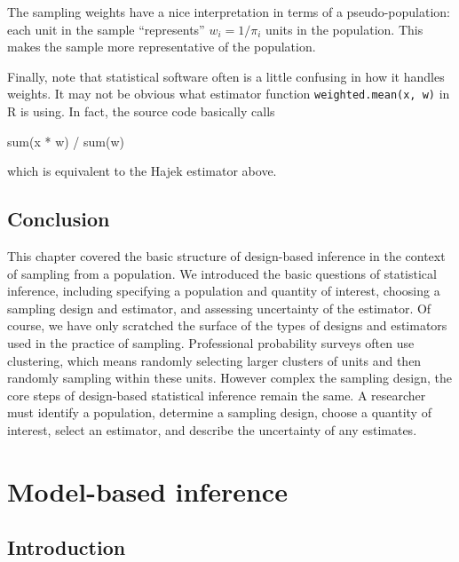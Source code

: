 \documentclass[
  letterpaper,
  DIV=11,
  numbers=noendperiod]{scrreprt}
\newenvironment{Shaded}{\begin{snugshade}}{\end{snugshade}}
\newcommand{\FunctionTok}[1]{\textcolor[rgb]{0.28,0.35,0.67}{#1}}
\newcommand{\NormalTok}[1]{\textcolor[rgb]{0.00,0.23,0.31}{#1}}
\newcommand{\SpecialCharTok}[1]{\textcolor[rgb]{0.37,0.37,0.37}{#1}}
\theoremstyle{plain}
\theoremstyle{definition}
\theoremstyle{definition}
\theoremstyle{remark}
\begin{document}
The sampling weights have a nice interpretation in terms of a
pseudo-population: each unit in the sample ``represents''
\(w_i = 1/\pi_i\) units in the population. This makes the sample more
representative of the population.

Finally, note that statistical software often is a little confusing in
how it handles weights. It may not be obvious what estimator function
\texttt{weighted.mean(x,\ w)} in R is using. In fact, the source code
basically calls

\begin{Shaded}
\begin{Highlighting}[]
\FunctionTok{sum}\NormalTok{(x }\SpecialCharTok{*}\NormalTok{ w) }\SpecialCharTok{/} \FunctionTok{sum}\NormalTok{(w)}
\end{Highlighting}
\end{Shaded}

which is equivalent to the Hajek estimator above.

\hypertarget{conclusion}{%
\section{Conclusion}\label{conclusion}}

This chapter covered the basic structure of design-based inference in
the context of sampling from a population. We introduced the basic
questions of statistical inference, including specifying a population
and quantity of interest, choosing a sampling design and estimator, and
assessing uncertainty of the estimator. Of course, we have only
scratched the surface of the types of designs and estimators used in the
practice of sampling. Professional probability surveys often use
clustering, which means randomly selecting larger clusters of units and
then randomly sampling within these units. However complex the sampling
design, the core steps of design-based statistical inference remain the
same. A researcher must identify a population, determine a sampling
design, choose a quantity of interest, select an estimator, and describe
the uncertainty of any estimates.

\hypertarget{model-based-inference}{%
\chapter{Model-based inference}\label{model-based-inference}}

\hypertarget{introduction-2}{%
\section{Introduction}\label{introduction-2}}
\end{document}

